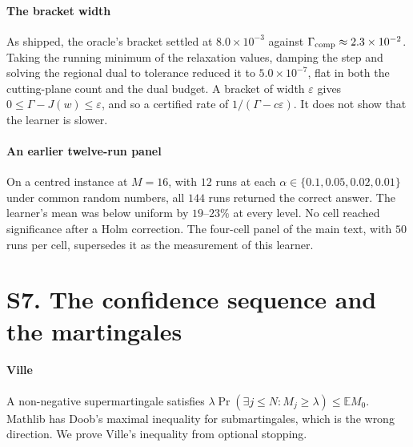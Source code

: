 
\paragraph{The bracket width} As shipped, the oracle's bracket settled at $8.0\times10^{-3}$
against $\Gamma_{\rm comp}\approx2.3\times10^{-2}$. Taking the running minimum of the relaxation
values, damping the step and solving the regional dual to tolerance reduced it to
$5.0\times10^{-7}$, flat in both the cutting-plane count and the dual budget. A bracket of width
$\varepsilon$ gives $0\le\Gamma-J(w)\le\varepsilon$, and so a certified rate of
$1/(\Gamma-c\varepsilon)$. It does not show that the learner is slower. \NUM{}


\paragraph{An earlier twelve-run panel} On a centred instance at $M=16$, with $12$ runs at each
$\alpha\in\{0.1,0.05,0.02,0.01\}$ under common random numbers, all $144$ runs returned the correct
answer. The learner's mean was below uniform by $19$--$23\%$ at every level. No cell reached
significance after a Holm correction. \NUM{} The four-cell panel of the main text, with $50$
runs per cell, supersedes it as the measurement of this learner.

\section{S7. The confidence sequence and the martingales}

\paragraph{Ville} A non-negative supermartingale satisfies
$\lambda\Pr(\exists j\le N: M_{j}\ge\lambda)\le\mathbb{E}M_{0}$. Mathlib has Doob's maximal
inequality for submartingales, which is the wrong direction. We prove Ville's inequality from
optional stopping.

